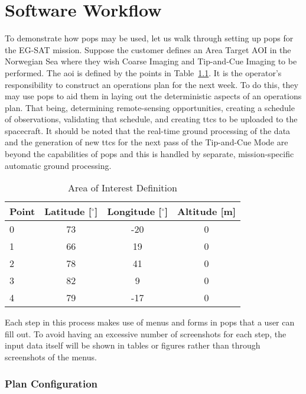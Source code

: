 \glsresetall{} 


\chapter{Software Workflow}\label{chap:workflow}

To demonstrate how \gls{pops} may be used, let us walk through setting up
\gls{pops} for the EG-SAT mission. Suppose the customer defines an Area Target
AOI in the Norwegian Sea where they wish Coarse Imaging and Tip-and-Cue Imaging
to be performed. The \gls{aoi} is defined by the points  in
Table~\ref{tab:norway-aoi}. It is the operator’s responsibility to construct an
operations plan for the next week. To do this, they may use \gls{pops} to aid
them in laying out the deterministic aspects of an operations plan.  That
being, determining remote-sensing opportunities, creating a schedule of
observations, validating that schedule, and creating \glspl{ttc} to be uploaded
to the spacecraft. It should be noted that the real-time ground processing of
the data and the generation of new \glspl{ttc} for the next pass of the
Tip-and-Cue Mode are beyond the capabilities of \gls{pops} and this is handled
by separate, mission-specific automatic ground processing.

\begin{table}[h] 
    \centering
    \caption{Area of Interest Definition}
    \begin{tabular}{cccc}
	Point                  & Latitude [$^\circ$] & Longitude [$^\circ$] & Altitude [m] \\ \hline
	\multicolumn{1}{l|}{0} & 73       & -20      & 0        \\
	\multicolumn{1}{l|}{1} & 66       & 19       & 0        \\
	\multicolumn{1}{l|}{2} & 78       & 41       & 0        \\
	\multicolumn{1}{l|}{3} & 82       & 9        & 0        \\
	\multicolumn{1}{l|}{4} & 79       & -17      & 0       
    \end{tabular}
    \label{tab:norway-aoi}
\end{table}

Each step in this process makes use of menus and forms in \gls{pops} that a
user can fill out. To avoid having an excessive number of screenshots for each
step, the input data itself will be shown in tables or figures rather than
through screenshots of the menus.

\subsection{Plan Configuration}


